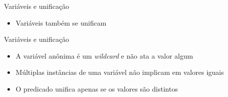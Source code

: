 \begin{frame}[fragile]{Variáveis e unificação}

    \begin{itemize}
        \item Variáveis também se unificam


    \end{itemize}

\end{frame}

\begin{frame}[fragile]{Variáveis e unificação}

    \begin{itemize}
        \item A variável anônima é um \textit{wildcard} e não ata a valor algum

        \item Múltiplas instâncias de uma variável não implicam em valores iguais

        \item O predicado  unifica apenas se os valores são distintos

    \end{itemize}

\end{frame}
